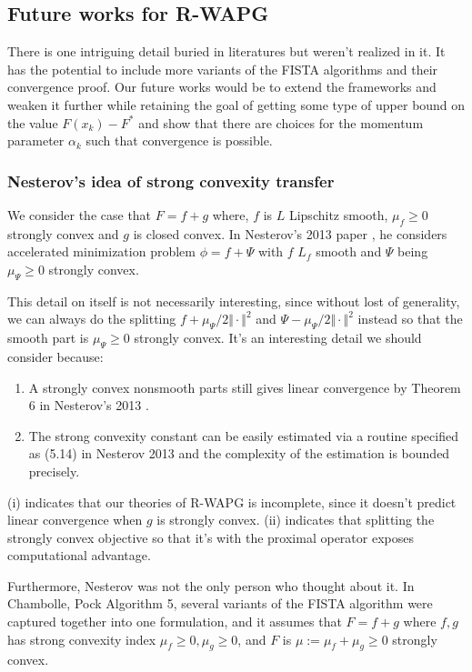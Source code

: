 \documentclass[12pt]{article}
\begin{document}
    \subsection{Future works for R-WAPG}
        There is one intriguing detail buried in literatures but weren't realized in it. 
        It has the potential to include more variants of the FISTA algorithms and their convergence proof. 
        Our future works would be to extend the frameworks and weaken it further while retaining the goal of getting some type of upper bound on the value $F(x_k) - F^*$ and show that there are choices for the momentum parameter $\alpha_k$ such that convergence is possible. 
        \subsubsection{Nesterov's idea of strong convexity transfer}
            We consider the case that $F = f + g$ where, $f$ is $L$ Lipschitz smooth, $\mu_f \ge 0$ strongly convex and $g$ is closed convex. 
            In Nesterov's 2013 paper \cite{nesterov_gradient_2013}, he considers accelerated  minimization problem $\phi = f + \Psi$ with $f$ $L_f$ smooth and $\Psi$ being $\mu_\Psi \ge 0$ strongly convex. 
            \par
            This detail on itself is not necessarily interesting, since without lost of generality, we can always do the splitting $f + \mu_\Psi/2 \Vert \cdot\Vert^2$ and $\Psi - \mu_\Psi/2\Vert \cdot\Vert^2$ instead so that the smooth part is $\mu_\Psi \ge 0$ strongly convex. 
            It's an interesting detail we should consider because: 
            \begin{enumerate}
                \item A strongly convex nonsmooth parts still gives linear convergence by Theorem 6 in Nesterov's 2013 \cite{nesterov_gradient_2013}. 
                \item The strong convexity constant can be easily estimated via a routine specified as (5.14) in Nesterov 2013 \cite{nesterov_gradient_2013} and the complexity of the estimation is bounded precisely. 
            \end{enumerate}
            (i) indicates that our theories of R-WAPG is incomplete, since it doesn't predict linear convergence when $g$ is strongly convex. 
            (ii) indicates that splitting the strongly convex objective so that it's with the proximal operator exposes computational advantage. 
            \par
            Furthermore, Nesterov was not the only person who thought about it.
            In 
            Chambolle, Pock \cite{chambolle_introduction_2016} Algorithm 5, several variants of the FISTA algorithm were captured together into one formulation, and it assumes that $F = f + g$ where $f, g$ has strong convexity index $\mu_f \ge 0, \mu_g \ge 0$, and $F$ is $\mu := \mu_f + \mu_g \ge 0$ strongly convex. 
            
\end{document}
